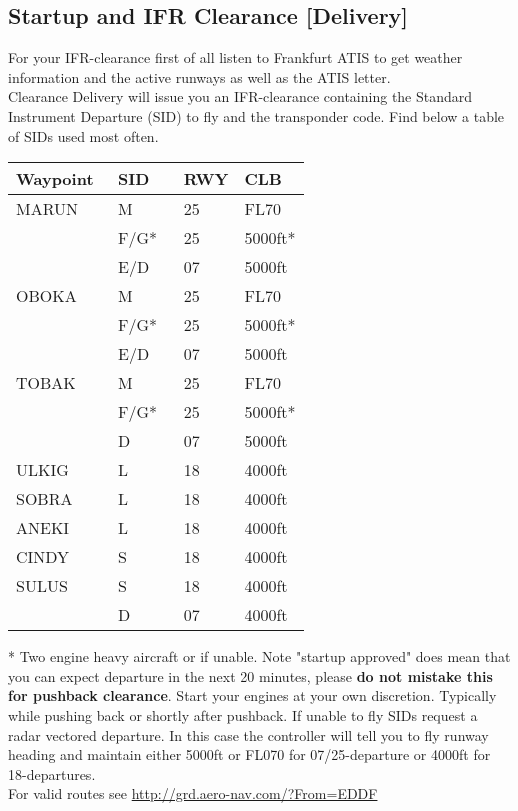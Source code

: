 \subsection[DEL]{Startup and IFR Clearance [Delivery]}
For your IFR-clearance first of all listen to Frankfurt ATIS to
get weather information and the active runways as well as
the ATIS letter.\\
Clearance Delivery will issue you an IFR-clearance containing the Standard Instrument Departure (SID) to fly and the transponder code. Find below a table of SIDs used most often.
\begin{table}[h]
	\begin{tabular}{|l|l|l|l|}
		\hline
		\textbf{Waypoint} & \textbf{SID}  & \textbf{RWY} & \textbf{CLB}\\\hline
		MARUN    & M 		& 25 & FL70			\\
				 & F/G*		& 25 & 5000ft* 		\\
				 & E/D		& 07 & 5000ft   	\\\hline
		OBOKA    & M 		& 25 & FL70			\\
				 & F/G*		& 25 & 5000ft* 		\\
				 & E/D		& 07 & 5000ft   	\\\hline
		TOBAK    & M    	& 25 & FL70	\\
				 & F/G*		& 25 & 5000ft* \\
				 & D		& 07 & 5000ft   	\\\hline
		ULKIG    & L   		& 18 & 4000ft 		\\\hline
		SOBRA    & L    	& 18 & 4000ft 		\\\hline
		ANEKI    & L    	& 18 & 4000ft 		\\\hline
		CINDY    & S    	& 18 & 4000ft 		\\\hline
		SULUS    & S    	& 18 & 4000ft  		\\
				 & D    	& 07 & 4000ft 		\\
		\hline
	\end{tabular}
\end{table}

* Two engine heavy aircraft or if unable.\newpage
Note "startup approved" does mean that you can expect departure in the next 20 minutes, please \textbf{do not mistake this for pushback clearance}. Start your engines at your own discretion. Typically while pushing back or shortly after
pushback.
If unable to fly SIDs request a radar vectored departure. In this case the controller will tell you to fly runway heading and maintain either 5000ft or FL070 for 07/25-departure or 4000ft for 18-departures.\\
For valid routes see \url{http://grd.aero-nav.com/?From=EDDF}

